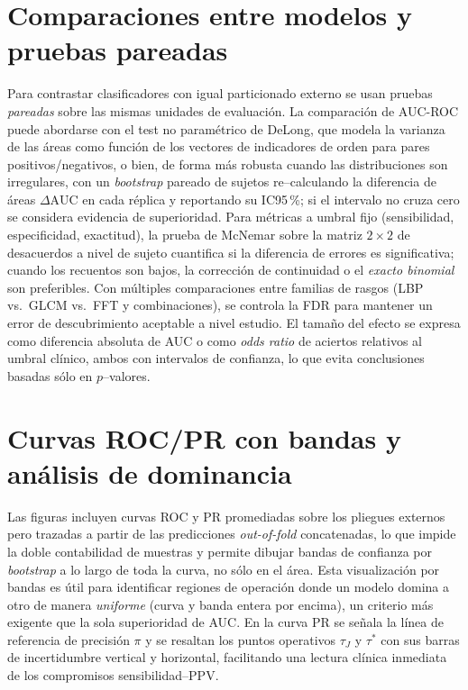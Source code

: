\section*{Comparaciones entre modelos y pruebas pareadas}
Para contrastar clasificadores con igual particionado externo se usan pruebas \emph{pareadas} sobre las mismas unidades de evaluación. La comparación de AUC-ROC puede abordarse con el test no paramétrico de DeLong, que modela la varianza de las áreas como función de los vectores de indicadores de orden para pares positivos/negativos, o bien, de forma más robusta cuando las distribuciones son irregulares, con un \emph{bootstrap} pareado de sujetos re–calculando la diferencia de áreas $\Delta\mathrm{AUC}$ en cada réplica y reportando su IC95\,\%; si el intervalo no cruza cero se considera evidencia de superioridad. Para métricas a umbral fijo (sensibilidad, especificidad, exactitud), la prueba de McNemar sobre la matriz $2\times 2$ de desacuerdos a nivel de sujeto cuantifica si la diferencia de errores es significativa; cuando los recuentos son bajos, la corrección de continuidad o el \emph{exacto binomial} son preferibles. Con múltiples comparaciones entre familias de rasgos (LBP vs.\ GLCM vs.\ FFT y combinaciones), se controla la FDR para mantener un error de descubrimiento aceptable a nivel estudio. El tamaño del efecto se expresa como diferencia absoluta de AUC o como \emph{odds ratio} de aciertos relativos al umbral clínico, ambos con intervalos de confianza, lo que evita conclusiones basadas sólo en $p$–valores.

\section*{Curvas ROC/PR con bandas y análisis de dominancia}
Las figuras incluyen curvas ROC y PR promediadas sobre los pliegues externos pero trazadas a partir de las predicciones \emph{out-of-fold} concatenadas, lo que impide la doble contabilidad de muestras y permite dibujar bandas de confianza por \emph{bootstrap} a lo largo de toda la curva, no sólo en el área. Esta visualización por bandas es útil para identificar regiones de operación donde un modelo domina a otro de manera \emph{uniforme} (curva y banda entera por encima), un criterio más exigente que la sola superioridad de AUC. En la curva PR se señala la línea de referencia de precisión $\pi$ y se resaltan los puntos operativos $\tau_J$ y $\tau^\ast$ con sus barras de incertidumbre vertical y horizontal, facilitando una lectura clínica inmediata de los compromisos sensibilidad–PPV.

